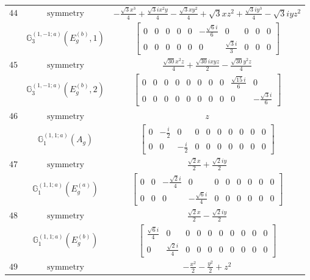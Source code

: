 \documentclass[fleqn,8pt,landscape]{jsarticle}
\begin{document}
\begin{longtable}{ccc}
$ 44 $ & $ \text{symmetry} $ & $ - \frac{\sqrt{3} x^{3}}{4} + \frac{\sqrt{3} i x^{2} y}{4} - \frac{\sqrt{3} x y^{2}}{4} + \sqrt{3} x z^{2} + \frac{\sqrt{3} i y^{3}}{4} - \sqrt{3} i y z^{2} $ \\
$  $ & $ \mathbb{G}_{3}^{(1,-1;a)}(E_{g}^{(b)},1) $ & $ \begin{bmatrix} 0 & 0 & 0 & 0 & 0 & - \frac{\sqrt{6} i}{6} & 0 & 0 & 0 & 0 \\ 0 & 0 & 0 & 0 & 0 & 0 & \frac{\sqrt{3} i}{3} & 0 & 0 & 0 \end{bmatrix} $ \\ \hline
$ 45 $ & $ \text{symmetry} $ & $ \frac{\sqrt{30} x^{2} z}{4} + \frac{\sqrt{30} i x y z}{2} - \frac{\sqrt{30} y^{2} z}{4} $ \\
$  $ & $ \mathbb{G}_{3}^{(1,-1;a)}(E_{g}^{(b)},2) $ & $ \begin{bmatrix} 0 & 0 & 0 & 0 & 0 & 0 & 0 & 0 & \frac{\sqrt{15} i}{6} & 0 \\ 0 & 0 & 0 & 0 & 0 & 0 & 0 & 0 & 0 & - \frac{\sqrt{3} i}{6} \end{bmatrix} $ \\ \hline
$ 46 $ & $ \text{symmetry} $ & $ z $ \\
$  $ & $ \mathbb{G}_{1}^{(1,1;a)}(A_{g}) $ & $ \begin{bmatrix} 0 & - \frac{i}{2} & 0 & 0 & 0 & 0 & 0 & 0 & 0 & 0 \\ 0 & 0 & - \frac{i}{2} & 0 & 0 & 0 & 0 & 0 & 0 & 0 \end{bmatrix} $ \\ \hline
$ 47 $ & $ \text{symmetry} $ & $ \frac{\sqrt{2} x}{2} + \frac{\sqrt{2} i y}{2} $ \\
$  $ & $ \mathbb{G}_{1}^{(1,1;a)}(E_{g}^{(a)}) $ & $ \begin{bmatrix} 0 & 0 & - \frac{\sqrt{2} i}{4} & 0 & 0 & 0 & 0 & 0 & 0 & 0 \\ 0 & 0 & 0 & - \frac{\sqrt{6} i}{4} & 0 & 0 & 0 & 0 & 0 & 0 \end{bmatrix} $ \\ \hline
$ 48 $ & $ \text{symmetry} $ & $ \frac{\sqrt{2} x}{2} - \frac{\sqrt{2} i y}{2} $ \\
$  $ & $ \mathbb{G}_{1}^{(1,1;a)}(E_{g}^{(b)}) $ & $ \begin{bmatrix} \frac{\sqrt{6} i}{4} & 0 & 0 & 0 & 0 & 0 & 0 & 0 & 0 & 0 \\ 0 & \frac{\sqrt{2} i}{4} & 0 & 0 & 0 & 0 & 0 & 0 & 0 & 0 \end{bmatrix} $ \\ \hline
$ 49 $ & $ \text{symmetry} $ & $ - \frac{x^{2}}{2} - \frac{y^{2}}{2} + z^{2} $ \\

\end{longtable}
\end{document}

